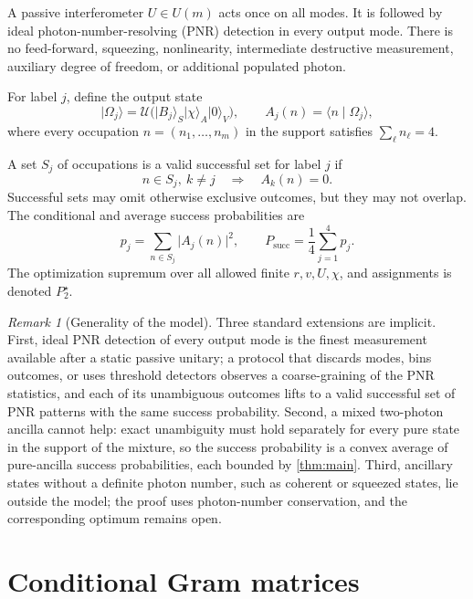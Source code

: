 \documentclass[11pt]{article}
\theoremstyle{remark}
\newtheorem{remark}[theorem]{Remark}
\newcommand{\ket}[1]{\lvert #1\rangle}
\newcommand{\braket}[2]{\langle #1\mid #2\rangle}
\newcommand{\abs}[1]{\lvert #1\rvert}
\newcommand{\psucc}{P_{\mathrm{succ}}}
\newcommand{\Pstar}{P_2^\star}
\begin{document}
A passive interferometer \(U\in U(m)\) acts once on all modes. It is followed
by ideal photon-number-resolving (PNR) detection in every output mode. There is
no feed-forward, squeezing, nonlinearity, intermediate destructive
measurement, auxiliary degree of freedom, or additional populated photon.

For label \(j\), define the output state
\begin{equation}
  \ket{\Omega_j}
   =\mathcal U\bigl(\ket{B_j}_S\ket\chi_A\ket0_V\bigr),
  \qquad
  A_j(n)=\braket{n}{\Omega_j},
\end{equation}
where every occupation \(n=(n_1,\ldots,n_m)\) in the support satisfies
\(\sum_\ell n_\ell=4\).

A set \(S_j\) of occupations is a valid successful set for label \(j\) if
\begin{equation}
  n\in S_j,\ k\ne j \quad\Longrightarrow\quad A_k(n)=0.
  \label{eq:unambiguous}
\end{equation}
Successful sets may omit otherwise exclusive outcomes, but they may not overlap.
The conditional and average success probabilities are
\begin{equation}
  p_j=\sum_{n\in S_j}\abs{A_j(n)}^2,
  \qquad
  \psucc=\frac14\sum_{j=1}^4p_j.
\end{equation}
The optimization supremum over all allowed finite \(r,v,U,\chi\), and
assignments is denoted \(\Pstar\).

\begin{remark}[Generality of the model]
\label{rem:generality}
Three standard extensions are implicit. First, ideal PNR detection of every
output mode is the finest measurement available after a static passive
unitary; a protocol that discards modes, bins outcomes, or uses threshold
detectors observes a coarse-graining of the PNR statistics, and each of its
unambiguous outcomes lifts to a valid successful set of PNR patterns with
the same success probability. Second, a mixed two-photon ancilla cannot
help: exact unambiguity must hold separately for every pure state in the
support of the mixture, so the success probability is a convex average of
pure-ancilla success probabilities, each bounded by \cref{thm:main}. Third,
ancillary states without a definite photon number, such as coherent or
squeezed states, lie outside the model; the proof uses photon-number
conservation, and the corresponding optimum remains open.
\end{remark}



\section{Conditional Gram matrices}
\label{sec:gram}
\end{document}
